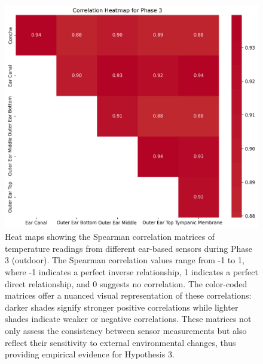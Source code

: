 \begin{figure}[!t]
    \centering
    \includegraphics[width=\textwidth]{thesis-doc/images/study1/hypothesis3/Correlation_Heatmap_Phase_3.png}
    \caption{Heat maps showing the Spearman correlation matrices of temperature readings from different ear-based sensors during Phase 3 (outdoor). The Spearman correlation values range from -1 to 1, where -1 indicates a perfect inverse relationship, 1 indicates a perfect direct relationship, and 0 suggests no correlation. The color-coded matrices offer a nuanced visual representation of these correlations: darker shades signify stronger positive correlations while lighter shades indicate weaker or negative correlations. These matrices not only assess the consistency between sensor measurements but also reflect their sensitivity to external environmental changes, thus providing empirical evidence for Hypothesis 3.}
    \label{fig:eval:study1:hypothesis3_result}
\end{figure}


